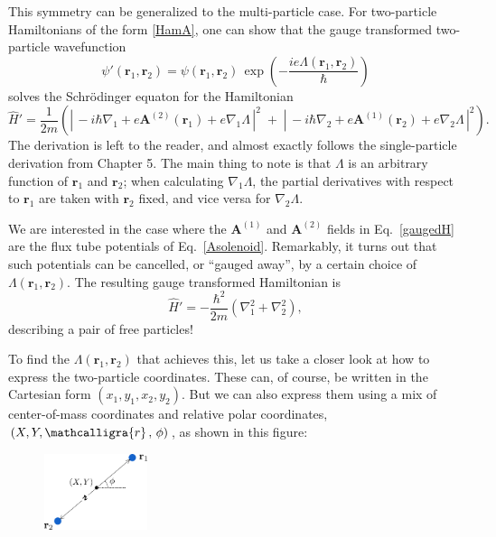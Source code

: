\documentclass[prx,12pt]{revtex4-2}
\begin{document}
This symmetry can be generalized to the multi-particle case.  For
two-particle Hamiltonians of the form \eqref{HamA}, one can show that
the gauge transformed two-particle wavefunction
\begin{equation}
  \psi'(\mathbf{r}_1, \mathbf{r}_2) = \psi(\mathbf{r}_1, \mathbf{r}_2)
  \, \exp\!\left(-\frac{ie\Lambda(\mathbf{r}_1, \mathbf{r}_2)}{\hbar}\right)
\end{equation}
solves the Schr\"odinger equaton for the Hamiltonian
\begin{equation}
  \hat{H}' = \frac{1}{2m} \left( \left| \, -i\hbar \nabla_1
  + e\mathbf{A}^{(2)}(\mathbf{r}_1) + e \nabla_1 \Lambda\,\right|^2
  \;+\; \left| \, -i\hbar \nabla_2
  + e\mathbf{A}^{(1)}(\mathbf{r}_2) + e \nabla_2\Lambda\,\right|^2\right).
  \label{gaugedH}
\end{equation}
The derivation is left to the reader, and almost exactly follows the
single-particle derivation from Chapter 5.  The main thing to note is
that $\Lambda$ is an arbitrary function of $\mathbf{r}_1$ and
$\mathbf{r}_2$; when calculating $\nabla_1\Lambda$, the partial
derivatives with respect to $\mathbf{r}_1$ are taken with
$\mathbf{r}_2$ fixed, and vice versa for $\nabla_2\Lambda$.

We are interested in the case where the $\mathbf{A}^{(1)}$ and
$\mathbf{A}^{(2)}$ fields in Eq.~\eqref{gaugedH} are the flux tube
potentials of Eq.~\eqref{Asolenoid}.  Remarkably, it turns out that
such potentials can be cancelled, or ``gauged away'', by a certain
choice of $\Lambda(\mathbf{r}_1, \mathbf{r}_2)$.  The resulting gauge
transformed Hamiltonian is
\begin{equation}
  \hat{H}' = - \frac{\hbar^2}{2m} \left( \nabla_1^2 + \nabla_2^2\right),
  \label{gaugedH2}
\end{equation}
describing a pair of free particles!

\clearpage
To find the $\Lambda(\mathbf{r}_1,\mathbf{r}_2)$ that achieves this,
let us take a closer look at how to express the two-particle
coordinates.  These can, of course, be written in the Cartesian form
$(x_1, y_1, x_2, y_2)$.  But we can also express them using a mix of
center-of-mass coordinates and relative polar coordinates, $(X, Y,
\mathcalligra{r}\,,\, \phi)$, as shown in this figure:

\begin{figure}[h]
  \centering\includegraphics[width=0.27\textwidth]{anyon-coordinates}
\end{figure}
\end{document}
